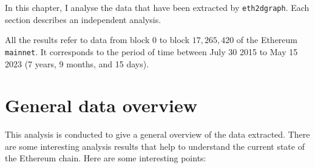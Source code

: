 \label{chapter-analysis}

In this chapter, I analyse the data that have been extracted by {\tt eth2dgraph}. Each section describes an independent analysis.

All the results refer to data from block $0$ to block $17,265,420$ of the Ethereum {\tt mainnet}. It corresponds to the period of time between July 30 2015 to May 15 2023 (7 years, 9 months, and 15 days).

\section{General data overview}

This analysis is conducted to give a general overview of the data extracted. There are some interesting analysis results that help to understand the current state of the Ethereum chain. Here are some interesting points:


